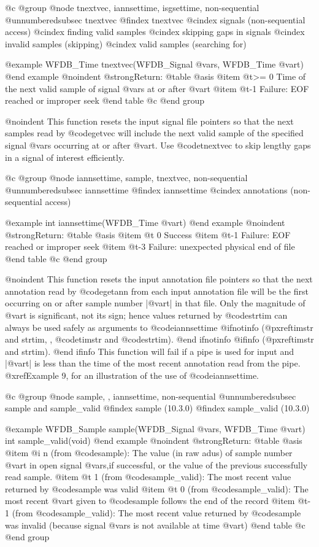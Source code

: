 {{{{{{{{@c @group
@node     tnextvec, iannsettime, isgsettime, non-sequential
@unnumberedsubsec tnextvec
@findex tnextvec
@cindex signals (non-sequential access)
@cindex finding valid samples
@cindex skipping gaps in signals
@cindex invalid samples (skipping)
@cindex valid samples (searching for)

@example
WFDB_Time tnextvec(WFDB_Signal @var{s}, WFDB_Time @var{t})
@end example
@noindent
@strong{Return:}
@table @asis
@item @t{>= 0}
Time of the next valid sample of signal @var{s} at or after @var{t}
@item @t{-1}
Failure: EOF reached or improper seek
@end table
@c @end group

@noindent
This function resets the input signal file pointers so that the next
samples read by @code{getvec} will include the next valid sample of
the specified signal @var{s} occurring at or after @var{t}.  Use
@code{tnextvec} to skip lengthy gaps in a signal of interest
efficiently.

@c @group
@node     iannsettime, sample, tnextvec, non-sequential
@unnumberedsubsec iannsettime
@findex iannsettime
@cindex annotations (non-sequential access)

@example
int iannsettime(WFDB_Time @var{t})
@end example
@noindent
@strong{Return:}
@table @asis
@item @t{ 0}
Success
@item @t{-1}
Failure: EOF reached or improper seek
@item @t{-3}
Failure: unexpected physical end of file
@end table
@c @end group

@noindent
This function resets the input annotation file pointers so that the next
annotation read by @code{getann} from each input annotation file will be
the first occurring on or after sample number |@var{t}| in that file.
Only the magnitude of @var{t} is significant, not its sign; hence values
returned by @code{strtim} can always be used safely as arguments to
@code{iannsettime}
@ifnotinfo
(@pxref{timstr and strtim, , @code{timstr} and @code{strtim}}).
@end ifnotinfo
@ifinfo
(@pxref{timstr and strtim}).
@end ifinfo
This function will fail if a pipe is used for input and |@var{t}| is less
than the time of the most recent annotation read from the pipe.
@xref{Example 9}, for an illustration of the use of @code{iannsettime}.

@c @group
@node     sample, , iannsettime, non-sequential
@unnumberedsubsec sample and sample_valid
@findex sample (10.3.0)
@findex sample_valid (10.3.0)

@example
WFDB_Sample sample(WFDB_Signal @var{s}, WFDB_Time @var{t})
int sample_valid(void)
@end example
@noindent
@strong{Return:}
@table @asis
@item @i{ n}
(from @code{sample}): The value (in raw adus) of sample number @var{t}
in open signal @var{s},if successful, or the value of the previous
successfully read sample.
@item @t{ 1}
(from @code{sample_valid}): The most recent value returned by
@code{sample} was valid
@item @t{ 0}
(from @code{sample_valid}): The most recent @var{t} given to @code{sample}
follows the end of the record
@item @t{-1}
(from @code{sample_valid}): The most recent value returned by
@code{sample} was invalid (because signal @var{s} is not available at time
@var{t})
@end table
@c @end group

}}}}}}}}
